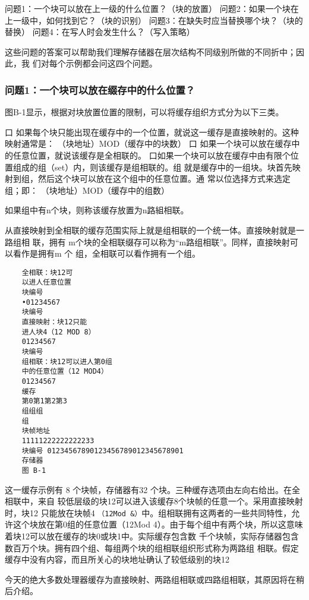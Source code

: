问题1：一个块可以放在上一级的什么位置？（块的放置）
问题2：如果一个块在上一级中，如何找到它？（块的识别）
问题3：在缺失时应当替换哪个块？（块的替换）
问题4：在写人时会发生什么？（写入策略）

这些问题的答案可以帮助我们理解存储器在层次结构不同级别所做的不同折中；因此，我
们对每个示例都会问这四个问题。

\subsubsection{问题1：一个块可以放在缀存中的什么位置？}
图B-1显示，根据对块放置位置的限制，可以将缓存组织方式分为以下三类。

口 如果每个块只能出现在缓存中的一个位置，就说这一缓存是直接映射的。这种映射通常是：
（块地址）MOD（缓存中的块数）
口 如果一个块可以放在缓存中的任意位置，就说该缓存是全相联的。
口如果一个块可以放在缓存中由有限个位置组成的组（set）内，则该缓存是组相联的。组
就是缓存中的一组块。块首先映射到组，然后这个块可以放在这个组中的任意位置。通
常以位选择方式来选定组；即：
（块地址）MOD（缓存中的组数）

如果组中有n个块，则称该缓存放置为n路組相联。

从直接映射到全相联的缓存范围实际上就是组相联的一个统一体。直接映射就是一路组相
联，拥有 m个块的全相联缀存可以称为“m路组相联”。同样，直接映射可以看作是拥有m 个
组，全相联可以看作拥有一个组。

\begin{verbatim}
    全相联：块12可
    以进人任意位置
    块编号
    •01234567
    块编号
    直接映射：块12只能
    进人块4（12 MOD 8）
    01234567
    块编号
    组相联：块12可以进人第0组
    中的任意位置（12 MOD4）
    01234567
    缓存
    第0第1第2第3
    组组组
    组
    块帧地址
    11111222222222233
    块编号 01234567890123456789012345678901
    存储器
    图 B-1
\end{verbatim}

这一缓存示例有 8 个块帧，存储器有32 个块。三种缓存选项由左向右给出。在全相联中，来自
较低层级的块12可以进入该缓存8个块帧的任意一个。采用直接映射时，块12 只能放在块帧4
\verb|（12Mod &）|中。组相联拥有这两者的一些共同特性，允许这个块放在第0组的任意位置（12Mod
4）。由于每个组中有两个块，所以这意味着块12可以放在缓存的块0或块1中。实际缓存包含数
千个块帧，实际存储器包含数百万个块。拥有四个组、每组两个块的组相联组织形式称为两路组
相联。假定缓存中没有内容，而且所关心的块地址确认了较低级别的块12

今天的绝大多数处理器缓存为直接映射、两路组相联或四路组相联，其原因将在稍后介绍。

